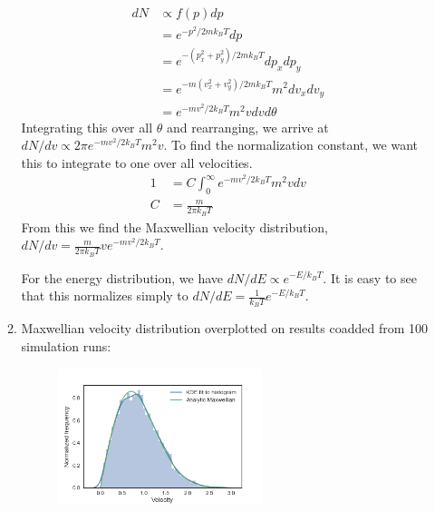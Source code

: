 \documentclass[11pt]{article}
\begin{document}
\begin{enumerate}
\begin{enumerate}
\begin{align}
    dN &\propto f(p)dp \\
    &= e^{-p^2/2mk_BT}dp \\
    &= e^{-(p_x^2 + p_y^2)/2mk_BT}dp_xdp_y \\
    &= e^{-m(v_x^2 + v_y^2)/2mk_BT}m^2dv_xdv_y \\
    &= e^{-mv^2/2k_BT}m^2v dv d\theta
    \end{align}
    Integrating this over all $\theta$ and rearranging, we arrive at $dN/dv \propto 2\pi e^{-mv^2/2k_BT}m^2v$. To find the normalization constant, we want this to integrate to one over all velocities.
    \begin{align}
    1 &= C \int_0^\infty e^{-mv^2/2k_BT}m^2v dv \\
    C &= \frac{m}{2\pi k_B T}
    \end{align}
    From this we find the Maxwellian velocity distribution, $dN/dv = \frac{m}{2\pi k_BT} v e^{-mv^2/2k_BT}$.
    
    For the energy distribution, we have $dN/dE \propto e^{-E/k_BT}$. It is easy to see that this normalizes simply to $dN/dE = \frac{1}{k_BT}e^{-E/k_BT}$.
    \item Maxwellian velocity distribution overplotted on results coadded from 100 simulation runs:
    \begin{figure}[H]
    \centering
    \includegraphics[width=0.6\textwidth]{maxwellian.png}
    \end{figure}


\end{enumerate}
\end{enumerate}
\end{document}
